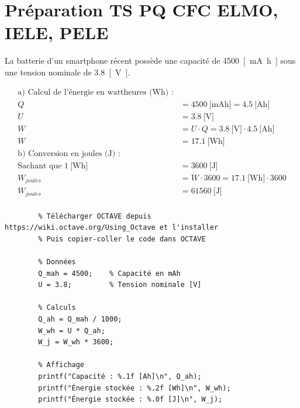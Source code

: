\documentclass[a4paper,11pt,answers,addpoints]{exam}
\begin{document}
	
	
	\unframedsolutions
	\pointsinmargin
	\bracketedpoints
	\section*{Préparation TS PQ CFC ELMO, IELE, PELE}
	\begin{questions}

\question La batterie d'un smartphone récent possède une capacité de \qty{4500}{[\milli\ampere\hour]} sous une tension nominale de \qty{3,8}{[\volt]}.

\begin{solution}
	\begin{align*}
		\text{a) Calcul de l'énergie en wattheures (Wh) :} & \\[6pt]
		Q &= \qty{4500}{[\milli\ampere\hour]} = \qty{4,5}{[\ampere\hour]} \\[6pt]
		U &= \qty{3,8}{[\volt]} \\[6pt]
		W &= U \cdot Q = \qty{3,8}{[\volt]} \cdot \qty{4,5}{[\ampere\hour]} \\[6pt]
		W &= \qty{17,1}{[\watt\hour]} \\[6pt]
		\text{b) Conversion en joules (J) :} & \\[6pt]
		\text{Sachant que } \qty{1}{[\watt\hour]} &= \qty{3600}{[\joule]} \\[6pt]
		W_{joules} &= W \cdot 3600 = \qty{17,1}{[\watt\hour]} \cdot 3600 \\[6pt]
		W_{joules} &= \qty{61560}{[\joule]} \\[6pt]
	\end{align*}
	
	\begin{verbatim}
		% Télécharger OCTAVE depuis https://wiki.octave.org/Using_Octave et l'installer
		% Puis copier-coller le code dans OCTAVE
		
		% Données
		Q_mah = 4500;    % Capacité en mAh
		U = 3.8;         % Tension nominale [V]
		
		% Calculs
		Q_ah = Q_mah / 1000;
		W_wh = U * Q_ah;
		W_j = W_wh * 3600;
		
		% Affichage
		printf("Capacité : %.1f [Ah]\n", Q_ah);
		printf("Énergie stockée : %.2f [Wh]\n", W_wh);
		printf("Énergie stockée : %.0f [J]\n", W_j);
	\end{verbatim}
\end{solution}
\end{questions}
\end{document}
